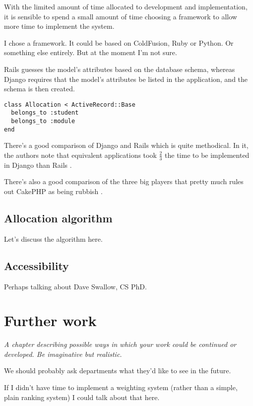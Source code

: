 \documentclass[]{article}
\begin{document}
With the limited amount of time allocated to development and implementation, it is sensible to spend a small amount of time choosing a framework to allow more time to implement the system.

I chose a framework. It could be based on ColdFusion, Ruby or Python. Or something else entirely. But at the moment I'm not sure.

Rails guesses the model's attributes based on the database schema, whereas Django requires that the model's attributes be listed in the application, and the schema is then created.

\begin{lstlisting}
class Allocation < ActiveRecord::Base
  belongs_to :student
  belongs_to :module
end
\end{lstlisting}

There's a good comparison of Django and Rails which is quite methodical. In it, the authors note that equivalent applications took $\frac{2}{3}$ the time to be implemented in Django than Rails \cite{RailsDjangoComparison_2007}.

There's also a good comparison of the three big players that pretty much rules out CakePHP as being rubbish \cite{EvalWebDevFrameworks_2009}.

\subsection{Allocation algorithm}

Let's discuss the algorithm here.

\subsection{Accessibility}

Perhaps talking about Dave Swallow, CS PhD.

\section{Further work}

\textit{A chapter describing possible ways in which your work could be continued or developed. Be imaginative but realistic.}

We should probably ask departments what they'd like to see in the future.

If I didn't have time to implement a weighting system (rather than a simple, plain ranking system) I could talk about that here.
\end{document}
